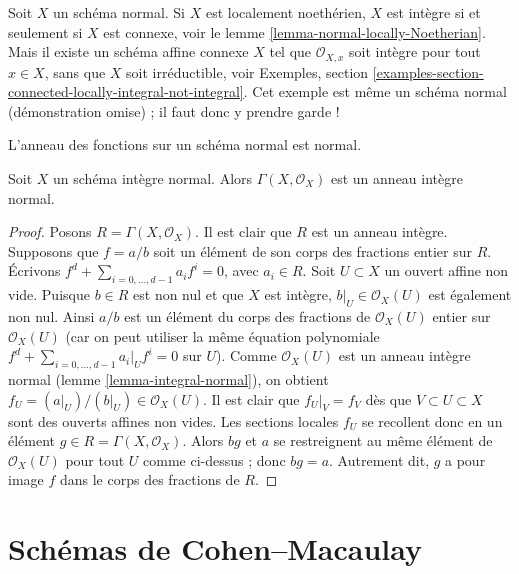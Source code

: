 \begin{remark}
\label{remark-normal-connected-irreducible}
Soit $X$ un schéma normal. Si $X$ est localement noethérien,
$X$ est intègre si et seulement si $X$ est connexe, voir le
lemme \ref{lemma-normal-locally-Noetherian}.
Mais il existe un schéma affine connexe $X$ tel que
$\mathcal{O}_{X, x}$ soit intègre pour tout $x \in X$, sans que $X$ soit
irréductible, voir Exemples, section
\ref{examples-section-connected-locally-integral-not-integral}.
Cet exemple est même un schéma normal (démonstration omise) ; il faut donc y prendre garde !
\end{remark}

\begin{lemma}
\label{lemma-normal-integral-sections}
\begin{slogan}
L'anneau des fonctions sur un schéma normal est normal.
\end{slogan}
Soit $X$ un schéma intègre normal.
Alors $\Gamma(X, \mathcal{O}_X)$ est un anneau intègre normal.
\end{lemma}

\begin{proof}
Posons $R = \Gamma(X, \mathcal{O}_X)$.
Il est clair que $R$ est un anneau intègre.
Supposons que $f = a/b$ soit un élément de son corps des
fractions entier sur $R$. Écrivons
$f^d + \sum_{i = 0, \ldots, d - 1} a_i f^i = 0$, avec
$a_i \in R$. Soit $U \subset X$ un ouvert affine non vide.
Puisque $b \in R$ est non nul et que $X$ est
intègre, $b|_U \in \mathcal{O}_X(U)$ est également non
nul. Ainsi $a/b$ est un élément du corps des fractions de
$\mathcal{O}_X(U)$ entier sur $\mathcal{O}_X(U)$
(car on peut utiliser la même équation polynomiale
$f^d + \sum_{i = 0, \ldots, d - 1} a_i|_U f^i = 0$ sur $U$).
Comme $\mathcal{O}_X(U)$ est un anneau intègre
normal (lemme \ref{lemma-integral-normal}), on obtient
$f_U = (a|_U)/(b|_U) \in \mathcal{O}_X(U)$. Il est clair
que $f_U|_V = f_V$ dès que $V \subset U \subset X$ sont
des ouverts affines non vides. Les sections locales $f_U$ se recollent donc en un élément
$g \in R = \Gamma(X, \mathcal{O}_X)$. Alors $bg$ et $a$
se restreignent au même élément de $\mathcal{O}_X(U)$ pour
tout $U$ comme ci-dessus ; donc $bg = a$. Autrement dit, $g$ a pour image $f$
dans le corps des fractions de $R$.
\end{proof}










\section{Schémas de Cohen--Macaulay}
\label{section-Cohen-Macaulay}

